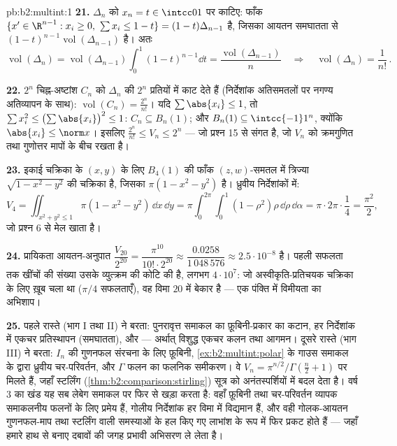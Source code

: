 \begin{solution}{pb:b2:multint:1}
\textbf{21.} $\Delta_n$ को $x_n = t \in \intcc01$ पर काटिए: फाँक $\{x' \in \R^{n-1} : x_i \geq 0,\ \sum x_i \leq 1 -
t\} = (1-t)\Delta_{n-1}$ है, जिसका आयतन
समघातता से $(1-t)^{n-1}\operatorname{vol}(\Delta_{n-1})$ है। अतः
\[
\operatorname{vol}(\Delta_n) =
\operatorname{vol}(\Delta_{n-1})\int_0^1(1 - t)^{n-1}\dd t =
\frac{\operatorname{vol}(\Delta_{n-1})}{n}
\quad\Longrightarrow\quad
\operatorname{vol}(\Delta_n) = \frac1{n!}\,.
\]

\textbf{22.} $2^n$ चिह्न-अष्टांश $C_n$ को $\Delta_n$ की $2^n$ प्रतियों में काट
देते हैं (निर्देशांक अतिसमतलों पर नगण्य अतिव्यापन के साथ): $\operatorname{vol}(C_n) = \frac{2^n}{n!}$।
यदि $\sum\abs{x_i} \leq 1$, तो $\sum x_i^2 \leq
\bigl(\sum\abs{x_i}\bigr)^2 \leq 1$: $C_n \subseteq B_n(1)$; और $B_n(1) \subseteq \intcc{-1}1^n$, क्योंकि $\abs{x_i} \leq
\norm x$। इसलिए $\frac{2^n}{n!} \leq V_n \leq 2^n$ ---
जो प्रश्न 15 से संगत है, जो $V_n$ को क्रमगुणित तथा गुणोत्तर मापों
के बीच रखता है।

\textbf{23.} इकाई चक्रिका के $(x, y)$ के लिए $B_4(1)$ की फाँक $(z, w)$-समतल में
त्रिज्या $\sqrt{1 - x^2 - y^2}$ की चक्रिका है, जिसका  $\pi(1 - x^2 - y^2)$ है। ध्रुवीय
निर्देशांकों में:
\[
V_4 = \iint_{x^2+y^2\leq1}\pi(1 - x^2 - y^2)\,\dd x\,\dd y
= \pi\int_0^{2\pi}\!\!\int_0^1(1 - \rho^2)\rho\,
\dd\rho\,\dd\alpha
= \pi\cdot2\pi\cdot\frac14 = \frac{\pi^2}2 ,
\]
जो प्रश्न 6 से मेल खाता है।

\textbf{24.} प्रायिकता आयतन-अनुपात $\dfrac{V_{20}}{2^{20}} = \dfrac{\pi^{10}}{10!\cdot2^{20}}
\approx \dfrac{0.0258}{1\,048\,576} \approx
2.5\cdot10^{-8}$ है। पहली सफलता तक खींचों की
संख्या उसके व्युत्क्रम की कोटि की है, लगभग $4\cdot10^7$: जो
अस्वीकृति-प्रतिचयक चक्रिका के लिए ख़ूब चला था ($\pi/4$ सफलताएँ), वह
विमा $20$ में बेकार है --- एक पंक्ति में विमीयता का अभिशाप।

\textbf{25.} पहले रास्ते (भाग I तथा II) ने बरता: पुनरावृत्त समाकल का
फ़ूबिनी-प्रकार का कटान, हर निर्देशांक में एकचर प्रतिस्थापन
(समघातता), और  --- अर्थात् विशुद्ध एकचर कलन तथा आगमन।
दूसरे रास्ते (भाग III) ने बरता: $I_n$ की गुणनफल संरचना के लिए
फ़ूबिनी, \cref{ex:b2:multint:polar} के गाउस समाकल के द्वारा ध्रुवीय चर-परिवर्तन, और $\Gamma$
फलन का फलनिक समीकरण। वे $V_n =
\pi^{n/2}/\Gamma(\frac n2 + 1)$ पर मिलते हैं, जहाँ स्टर्लिंग (\cref{thm:b2:comparison:stirling})
सूत्र को अनंतस्पर्शियों में बदल देता है। वर्ष 3 का खंड यह सब लेबेग
समाकल पर फिर से खड़ा करता है: वहाँ फ़ूबिनी तथा चर-परिवर्तन व्यापक
समाकलनीय फलनों के लिए प्रमेय हैं, गोलीय निर्देशांक हर विमा में
विद्यमान हैं, और वही गोलक-आयतन गुणनफल-माप तथा स्टर्लिंग वाली
समस्याओं के हल किए गए लाभांश के रूप में फिर प्रकट होते हैं --- जहाँ
हमारे हाथ से बनाए दबावों की जगह प्रभावी अभिसरण ले लेता है।
\end{solution}
